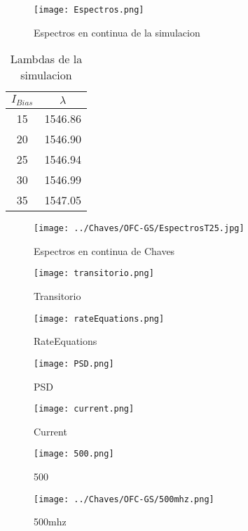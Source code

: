 \graphicspath{{$HOME/TFG/Graphics/Cpt1-Charactz/}}

		\begin{figure}[H]
			\centering
			\texttt{[image: Espectros.png]}
			\caption{\label{Img:widgets}Espectros en continua de la simulacion}
		\end{figure}

		\begin{table}[H]
			\centering
			\begin{tabular}{c c}
				\hline
				$I_{Bias}$ & $\lambda$ \\\hline 
				15 & 1546.86 \\
				20 & 1546.90 \\
				25 & 1546.94 \\
				30 & 1546.99 \\
				35 & 1547.05 \\\hline
			\end{tabular}
			\caption{\label{tab:label}Lambdas de la simulacion}
		\end{table}

		\begin{figure}[H]
			\centering
			\texttt{[image: ../Chaves/OFC-GS/EspectrosT25.jpg]}
			\caption{\label{fig:EspectrosT25}Espectros en continua de Chaves}	
		\end{figure}
	

		\begin{figure}[H]
			\centering
			\texttt{[image: transitorio.png]}
			\caption{\label{fig:transitorio}Transitorio}	
		\end{figure}

		\begin{figure}[H]
			\centering
			\texttt{[image: rateEquations.png]}
			\caption{\label{fig:rateEquations}RateEquations}	
		\end{figure}

		\begin{figure}[H]
			\centering
			\texttt{[image: PSD.png]}
			\caption{\label{fig:PSD}PSD}	
		\end{figure}

		\begin{figure}[H]
			\centering
			\texttt{[image: current.png]}
			\caption{\label{fig:current}Current}	
		\end{figure}

		\begin{figure}[H]
			\centering
			\texttt{[image: 500.png]}
			\caption{\label{fig:500}500}	
		\end{figure}

		\begin{figure}[H]
			\centering
			\texttt{[image: ../Chaves/OFC-GS/500mhz.png]}
			\caption{\label{fig:500mhz}500mhz}	
		\end{figure}
